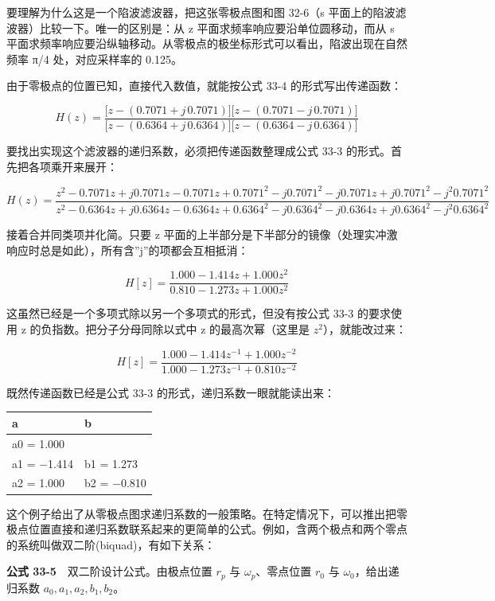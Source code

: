 要理解为什么这是一个陷波滤波器，把这张零极点图和图 32-6（s
平面上的陷波滤波器）比较一下。唯一的区别是：从 z
平面求频率响应要沿单位圆移动，而从 s
平面求频率响应要沿纵轴移动。从零极点的极坐标形式可以看出，陷波出现在自然频率
π/4 处，对应采样率的 0.125。

由于零极点的位置已知，直接代入数值，就能按公式 33-4 的形式写出传递函数：

\[H(z) = \frac{\big[z - (0.7071 + j\,0.7071)\big]\big[z - (0.7071 - j\,0.7071)\big]}{\big[z - (0.6364 + j\,0.6364)\big]\big[z - (0.6364 - j\,0.6364)\big]}\]

要找出实现这个滤波器的递归系数，必须把传递函数整理成公式 33-3
的形式。首先把各项乘开来展开：

\[H(z) = \frac{z^2 - 0.7071z + j0.7071z - 0.7071z + 0.7071^2 - j0.7071^2 - j0.7071z + j0.7071^2 - j^2 0.7071^2}{z^2 - 0.6364z + j0.6364z - 0.6364z + 0.6364^2 - j0.6364^2 - j0.6364z + j0.6364^2 - j^2 0.6364^2}\]

接着合并同类项并化简。只要 z
平面的上半部分是下半部分的镜像（处理实冲激响应时总是如此），所有含''j''的项都会互相抵消：

\[H[z] = \frac{1.000 - 1.414z + 1.000z^2}{0.810 - 1.273z + 1.000z^2}\]

这虽然已经是一个多项式除以另一个多项式的形式，但没有按公式 33-3
的要求使用 z 的负指数。把分子分母同除以式中 z 的最高次幂（这里是
\(z^2\)），就能改过来：

\[H[z] = \frac{1.000 - 1.414z^{-1} + 1.000z^{-2}}{1.000 - 1.273z^{-1} + 0.810z^{-2}}\]

既然传递函数已经是公式 33-3 的形式，递归系数一眼就能读出来：

{\def\LTcaptype{none} %
\begin{longtable}[]{@{}ll@{}}
\toprule\noalign{}
a & b \\
\midrule\noalign{}
\endhead
\bottomrule\noalign{}
\endlastfoot
a0 = 1.000 & \\
a1 = −1.414 & b1 = 1.273 \\
a2 = 1.000 & b2 = −0.810 \\
\end{longtable}
}

这个例子给出了从零极点图求递归系数的一般策略。在特定情况下，可以推出把零极点位置直接和递归系数联系起来的更简单的公式。例如，含两个极点和两个零点的系统叫做双二阶(biquad)，有如下关系：

\textbf{公式 33-5}　双二阶设计公式。由极点位置 \(r_p\) 与
\(\omega_p\)、零点位置 \(r_0\) 与 \(\omega_0\)，给出递归系数
\(a_0, a_1, a_2, b_1, b_2\)。

